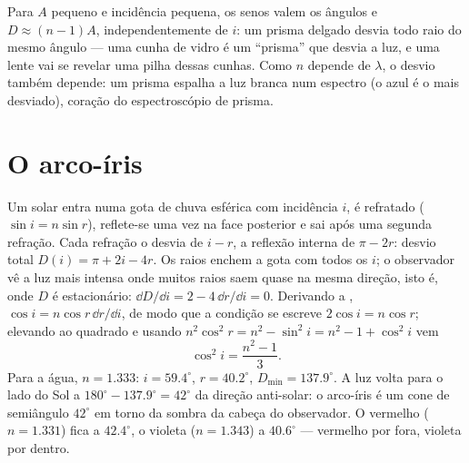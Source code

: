 \begin{remark}\label{rem:b1:rays-reflection-refraction:thin}
Para $A$ pequeno e incidência pequena, os senos valem os ângulos e
$D \approx (n - 1)A$, independentemente de $i$: um prisma delgado desvia todo
raio do mesmo ângulo --- uma cunha de vidro é um ``prisma'' que desvia a
luz, e uma lente vai se revelar uma pilha dessas cunhas. Como
$n$ depende de $\lambda$, o desvio também depende: um prisma espalha a luz
branca num espectro (o azul é o mais desviado), coração do
espectroscópio de prisma.
\end{remark}

\section{O arco-íris}

\begin{example}\label{ex:b1:rays-reflection-refraction:rainbow}
Um  solar entra numa gota de chuva esférica com incidência $i$, é
refratado ($\sin i = n\sin r$), reflete-se uma vez na face posterior e
sai após uma segunda refração. Cada refração o desvia de
$i - r$, a reflexão interna de $\pi - 2r$: desvio total
$D(i) = \pi + 2i - 4r$. Os raios enchem a gota com todos os $i$; o observador
vê a luz mais intensa onde muitos raios saem quase na mesma
direção, isto é, onde $D$ é estacionário: $\dd D/\dd i = 2 - 4\,\dd r/\dd i
= 0$. Derivando a , $\cos i = n\cos r\,\dd r/\dd i$, de modo que
a condição se escreve $2\cos i = n\cos r$; elevando ao quadrado e usando
$n^2\cos^2 r = n^2 - \sin^2 i = n^2 - 1 + \cos^2 i$ vem
\[
\cos^2 i = \frac{n^2 - 1}{3} .
\]
Para a água, $n = 1.333$: $i = 59.4^\circ$, $r = 40.2^\circ$,
$D_{\min} = 137.9^\circ$. A luz volta para o lado do Sol
a $180^\circ - 137.9^\circ = 42^\circ$ da direção anti-solar:
o arco-íris é um cone de semiângulo $42^\circ$ em torno da sombra da
cabeça do observador. O vermelho ($n = 1.331$) fica a $42.4^\circ$, o violeta
($n = 1.343$) a $40.6^\circ$ --- vermelho por fora, violeta por dentro.
\end{example}

